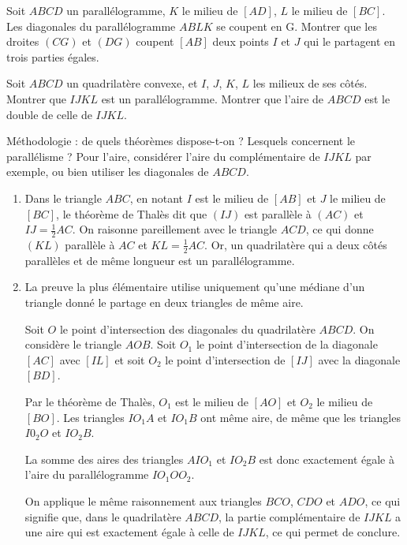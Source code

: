 \begin{exo}
Soit $ABCD$ un parallélogramme, $K$ le milieu de $[AD]$, $L$ le milieu de $[BC]$.
Les diagonales du parallélogramme $ABLK$ se coupent en G.
Montrer que les droites $(CG)$ et $(DG)$ coupent $[AB]$ deux points $I$ et $J$ qui le partagent en trois parties égales.
\end{exo}


\begin{exo} \label{Varignon}
Soit $ABCD$ un quadrilatère convexe, et $I$, $J$, $K$, $L$ les milieux de ses côtés. Montrer que $IJKL$ est un parallélogramme. Montrer que l'aire de $ABCD$ est le double de celle de $IJKL$.
\begin{hint} Méthodologie : de quels théorèmes dispose-t-on ? Lesquels concernent le parallélisme ? Pour l'aire, considérer l'aire du complémentaire de $IJKL$ par exemple, ou bien utiliser les diagonales de $ABCD$.
\end{hint}
\begin{sol}
\begin{enumerate}
\item 
Dans le triangle $ABC$, en notant $I$ est le milieu de $[AB]$ et $J$ le milieu de $[BC]$, le théorème de Thalès dit que $(IJ)$ est parall\`ele \`a $(AC)$ et $IJ = \frac{1}{2} AC$. On raisonne pareillement avec le triangle $ACD$, ce qui donne $(KL)$ parall\`ele \`a $AC$ et $KL = \frac{1}{2} AC$. Or, un quadrilat\`ere qui a deux c\^ot\'es parall\`eles et de m\^eme longueur est un parall\'elogramme.

\item La preuve la plus élémentaire utilise uniquement qu'une médiane d'un triangle donné le partage en deux triangles de même aire.

Soit $O$ le point d'intersection des diagonales du quadrilat\`ere $ABCD$. On consid\`ere le triangle $AOB$. Soit $O_1$ le point d'intersection de la diagonale $[AC]$ avec $[IL]$ et soit $O_2$ le point d'intersection de $[IJ]$ avec la diagonale $[BD]$.

 
Par le théorème de Thalès,  $O_1$ est le milieu de $[AO]$ et $O_2$ le milieu de $[BO]$. Les triangles $IO_1A$ et $IO_1B$ ont même aire, de même que les triangles $I0_2O$ et $IO_2B$.

La somme des aires des triangles $AIO_1$ et $IO_2B$ est donc exactement \'egale \`a l'aire du parall\'elogramme $IO_1OO_2$. 
 
On applique le m\^eme raisonnement aux triangles $BCO$, $CDO$ et $ADO$, ce qui signifie que, dans le quadrilat\`ere $ABCD$, la partie compl\'ementaire de $IJKL$ a une aire qui est exactement \'egale \`a celle de $IJKL$, ce qui permet de conclure. \end{enumerate}

\end{sol}
\end{exo}

